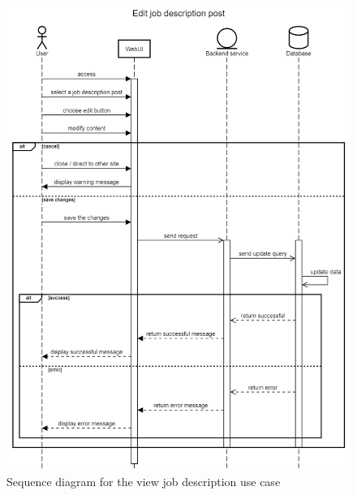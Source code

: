 \documentclass[a4paper]{article}
\begin{document}
    \begin{figure}[ht]
        \centering
        \includegraphics[width=1.0\textwidth]{Edit job description post.png}
        \caption{Sequence diagram for the view job description use case}
        \label{fig:fig15}
    \end{figure}
\end{document}
